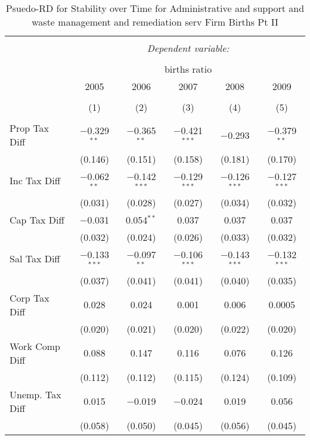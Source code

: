 
\begin{table}[!htbp] \centering 
  \caption{Psuedo-RD for Stability over Time for  Administrative and support and waste management and remediation serv Firm Births Pt II} 
  \label{56year} 
\small 
\begin{tabular}{@{\extracolsep{5pt}}lccccc} 
\\[-1.8ex]\hline 
\hline \\[-1.8ex] 
 & \multicolumn{5}{c}{\textit{Dependent variable:}} \\ 
\cline{2-6} 
\\[-1.8ex] & \multicolumn{5}{c}{births ratio} \\ 
 & 2005 & 2006 & 2007 & 2008 & 2009 \\ 
\\[-1.8ex] & (1) & (2) & (3) & (4) & (5)\\ 
\hline \\[-1.8ex] 
 Prop Tax Diff & $-$0.329$^{**}$ & $-$0.365$^{**}$ & $-$0.421$^{***}$ & $-$0.293 & $-$0.379$^{**}$ \\ 
  & (0.146) & (0.151) & (0.158) & (0.181) & (0.170) \\ 
  Inc Tax Diff & $-$0.062$^{**}$ & $-$0.142$^{***}$ & $-$0.129$^{***}$ & $-$0.126$^{***}$ & $-$0.127$^{***}$ \\ 
  & (0.031) & (0.028) & (0.027) & (0.034) & (0.032) \\ 
  Cap Tax Diff & $-$0.031 & 0.054$^{**}$ & 0.037 & 0.037 & 0.037 \\ 
  & (0.032) & (0.024) & (0.026) & (0.033) & (0.032) \\ 
  Sal Tax Diff & $-$0.133$^{***}$ & $-$0.097$^{**}$ & $-$0.106$^{***}$ & $-$0.143$^{***}$ & $-$0.132$^{***}$ \\ 
  & (0.037) & (0.041) & (0.041) & (0.040) & (0.035) \\ 
  Corp Tax Diff & 0.028 & 0.024 & 0.001 & 0.006 & 0.0005 \\ 
  & (0.020) & (0.021) & (0.020) & (0.022) & (0.020) \\ 
  Work Comp Diff & 0.088 & 0.147 & 0.116 & 0.076 & 0.126 \\ 
  & (0.112) & (0.112) & (0.115) & (0.124) & (0.109) \\ 
  Unemp. Tax Diff & 0.015 & $-$0.019 & $-$0.024 & 0.019 & 0.056 \\ 
  & (0.058) & (0.050) & (0.045) & (0.056) & (0.045) \\ 

\end{tabular}
\end{table}
